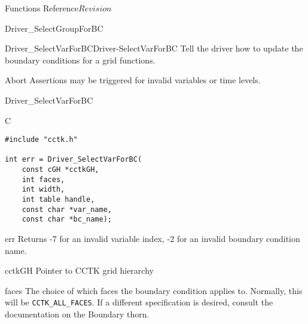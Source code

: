 \begin{cactuspart}{ Functions Reference}{}{$Revision$}
\begin{FunctionDescription}{Driver\_SelectGroupForBC}
\begin{SeeAlsoSection}
\begin{SeeAlso2}{Driver\_SelectVarForBC}{Driver-SelectVarForBC}
Tell the driver how to update the boundary conditions for a grid functions.
\end{SeeAlso2}
\end{SeeAlsoSection}

\begin{ErrorSection}
\begin{Error}{Abort}
Assertions may be triggered for invalid variables or time levels.
\end{Error}
\end{ErrorSection}
\end{FunctionDescription}

\begin{FunctionDescription}{Driver\_SelectVarForBC}
\label{Driver-SelectVarForBC}
\begin{SynopsisSection}
\begin{Synopsis}{C}
\begin{verbatim}
#include "cctk.h"

int err = Driver_SelectVarForBC(
    const cGH *cctkGH,
    int faces,
    int width,
    int table handle,
    const char *var_name,
    const char *bc_name);

\end{verbatim}
\end{Synopsis}
\end{SynopsisSection}

\begin{ResultSection}
\begin{Result}{err}
Returns -7 for an invalid variable index, -2 for an invalid boundary condition name.
\end{Result}
\end{ResultSection}

\begin{ParameterSection}
\begin{Parameter}{cctkGH}
Pointer to CCTK grid hierarchy
\end{Parameter}
\end{ParameterSection}

\begin{ParameterSection}
\begin{Parameter}{faces}
The choice of which faces the boundary condition applies to.
Normally, this will be \texttt{CCTK\_ALL\_FACES}. If a different
specification is desired, consult the documentation on the
Boundary thorn.
\end{Parameter}
\end{ParameterSection}


\end{FunctionDescription}
\end{cactuspart}
